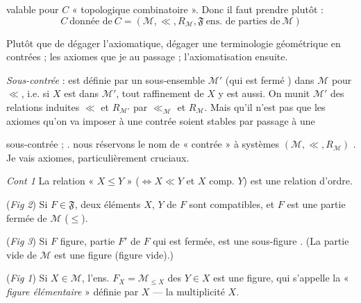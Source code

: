 \documentclass[11pt,a4paper]{article}
\begin{document}
valable pour $C$ « topologique combinatoire ». Donc il faut prendre plutôt :
\[
  C \ \text{donnée de}\ C = (\mathcal{M}, \ll, R_{\mathcal{M}}, \mathfrak{F} \ \text{ens. de parties de}\ \mathcal{M})
\]

Plutôt que de dégager \ill{} l'axiomatique, dégager une terminologie géométrique \ill{} en contrées \ill{} ; les axiomes que je \ill{} au passage ; l'axiomatisation \ill{} ensuite.

\emph{Sous-contrée} : est définie par un sous-ensemble $\mathcal{M}'$ \struck{\ill{}} (qui est fermé \ill{}) dans $\mathcal{M}$ pour $\ll$, i.e. si $X$ est dans $\mathcal{M}'$, tout raffinement de $X$ y est aussi.  On munit $\mathcal{M}'$ des relations induites $\ll$ et $R_{\mathcal{M}'}$ \struck{\ill{}} par $\ll_{\mathcal{M}}$ et $R_{\mathcal{M}}$. Mais \ill{} qu'il n'est pas   que les axiomes qu'on va imposer à une contrée soient stables par passage à une

sous-contrée ; \ill{} \ill{}. \ill{} nous réservons le nom de « contrée » à \ill{} systèmes $(\mathcal{M}, \ll, R_{\mathcal{M}})$ \ill{}. Je vais \ill{} \ill{} axiomes, particulièrement cruciaux.

\emph{Cont 1} \quad La relation « $X \leq Y$ » ($\Leftrightarrow X \ll Y$ et $X$ comp. $Y$) est une relation d'ordre.

 (\emph{Fig 2}) \struck{\ill{}} Si $F \in \mathfrak{F}$, deux éléments $X$, $Y$ de $F$ sont compatibles, et $F$ est une partie fermée de $\mathcal{M}$ ($\leq$).

 (\emph{Fig 3}) Si $F$   figure, \ill{} partie $F'$ de $F$ qui est fermée, est une sous-figure \ill{}. (La partie vide de $\mathcal{M}$ est une figure (figure vide).)

 (\emph{Fig 1}) Si $X \in \mathcal{M}$, l'ens. $F_X = \mathcal{M}_{\leq X}$ des $Y \in X$  est une figure, qui s'appelle la « \emph{figure élémentaire} » définie par $X$ — la multiplicité $X$.
\end{document}
